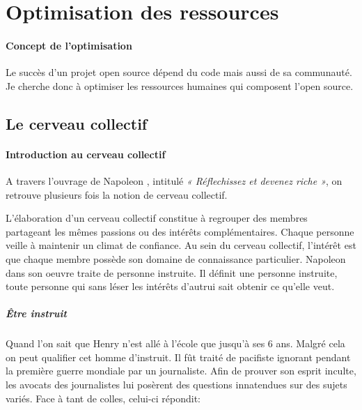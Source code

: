 	\section{Optimisation des ressources} 

		\paragraph{Concept de l'optimisation\\}

	 		Le succès d'un projet open source dépend du code mais aussi de sa communauté. Je cherche donc à optimiser les ressources humaines qui composent l'open source.

		\subsection{Le cerveau collectif}
			\paragraph{Introduction au cerveau collectif\\}

				A travers l'ouvrage de Napoleon , intitulé \emph{« Réflechissez et devenez riche »}, on retrouve plusieurs fois la notion de cerveau collectif.

				L'élaboration d'un cerveau collectif constitue à regrouper des membres partageant les mêmes passions ou des intérêts complémentaires.
				Chaque personne veille à maintenir un climat de confiance.
				Au sein du cerveau collectif, l'intérêt est que chaque membre possède son domaine de connaissance particulier. 
				Napoleon  dans son oeuvre traite de personne instruite. Il définit une personne instruite, toute personne qui sans léser les intérêts d'autrui sait obtenir ce qu'elle veut.

				\subparagraph{Être instruit\\}

					Quand l'on sait que Henry  n'est allé à l'école que jusqu'à ses 6 ans. Malgré cela on peut qualifier cet homme d'instruit. Il fût traité de pacifiste ignorant pendant la première guerre mondiale par un journaliste. Afin de prouver son esprit inculte, les avocats des journalistes lui posèrent des questions innatendues sur des sujets variés. Face à tant de colles, celui-ci répondit:


